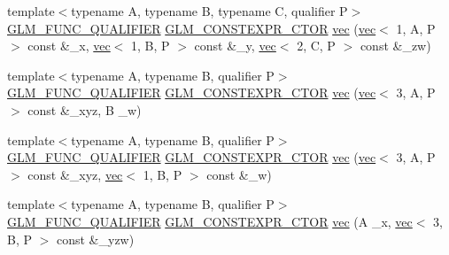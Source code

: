 \begin{DoxyCompactItemize}
\item 
{\footnotesize template$<$typename A, typename B, typename C, qualifier P$>$ }\\\mbox{\hyperlink{setup_8hpp_a33fdea6f91c5f834105f7415e2a64407}{G\+L\+M\+\_\+\+F\+U\+N\+C\+\_\+\+Q\+U\+A\+L\+I\+F\+I\+ER}} \mbox{\hyperlink{setup_8hpp_ad34178a09666081abdb573c14d1f4a5a}{G\+L\+M\+\_\+\+C\+O\+N\+S\+T\+E\+X\+P\+R\+\_\+\+C\+T\+OR}} \mbox{\hyperlink{structglm_1_1vec_3_014_00_01_t_00_01_q_01_4_ab16d5c7c6e22f08e197088a9535a114b}{vec}} (\mbox{\hyperlink{structglm_1_1vec}{vec}}$<$ 1, A, P $>$ const \&\+\_\+x, \mbox{\hyperlink{structglm_1_1vec}{vec}}$<$ 1, B, P $>$ const \&\+\_\+y, \mbox{\hyperlink{structglm_1_1vec}{vec}}$<$ 2, C, P $>$ const \&\+\_\+zw)
\item 
{\footnotesize template$<$typename A, typename B, qualifier P$>$ }\\\mbox{\hyperlink{setup_8hpp_a33fdea6f91c5f834105f7415e2a64407}{G\+L\+M\+\_\+\+F\+U\+N\+C\+\_\+\+Q\+U\+A\+L\+I\+F\+I\+ER}} \mbox{\hyperlink{setup_8hpp_ad34178a09666081abdb573c14d1f4a5a}{G\+L\+M\+\_\+\+C\+O\+N\+S\+T\+E\+X\+P\+R\+\_\+\+C\+T\+OR}} \mbox{\hyperlink{structglm_1_1vec_3_014_00_01_t_00_01_q_01_4_adf93c96aee6aa7910fb218b3d0cb8697}{vec}} (\mbox{\hyperlink{structglm_1_1vec}{vec}}$<$ 3, A, P $>$ const \&\+\_\+xyz, B \+\_\+w)
\item 
{\footnotesize template$<$typename A, typename B, qualifier P$>$ }\\\mbox{\hyperlink{setup_8hpp_a33fdea6f91c5f834105f7415e2a64407}{G\+L\+M\+\_\+\+F\+U\+N\+C\+\_\+\+Q\+U\+A\+L\+I\+F\+I\+ER}} \mbox{\hyperlink{setup_8hpp_ad34178a09666081abdb573c14d1f4a5a}{G\+L\+M\+\_\+\+C\+O\+N\+S\+T\+E\+X\+P\+R\+\_\+\+C\+T\+OR}} \mbox{\hyperlink{structglm_1_1vec_3_014_00_01_t_00_01_q_01_4_a27077d4fe09d53d6068b43e31e264eb6}{vec}} (\mbox{\hyperlink{structglm_1_1vec}{vec}}$<$ 3, A, P $>$ const \&\+\_\+xyz, \mbox{\hyperlink{structglm_1_1vec}{vec}}$<$ 1, B, P $>$ const \&\+\_\+w)
\item 
{\footnotesize template$<$typename A, typename B, qualifier P$>$ }\\\mbox{\hyperlink{setup_8hpp_a33fdea6f91c5f834105f7415e2a64407}{G\+L\+M\+\_\+\+F\+U\+N\+C\+\_\+\+Q\+U\+A\+L\+I\+F\+I\+ER}} \mbox{\hyperlink{setup_8hpp_ad34178a09666081abdb573c14d1f4a5a}{G\+L\+M\+\_\+\+C\+O\+N\+S\+T\+E\+X\+P\+R\+\_\+\+C\+T\+OR}} \mbox{\hyperlink{structglm_1_1vec_3_014_00_01_t_00_01_q_01_4_a0f2076b0eb558352f0d57e058e3e9c70}{vec}} (A \+\_\+x, \mbox{\hyperlink{structglm_1_1vec}{vec}}$<$ 3, B, P $>$ const \&\+\_\+yzw)
\item 

\end{DoxyCompactItemize}
